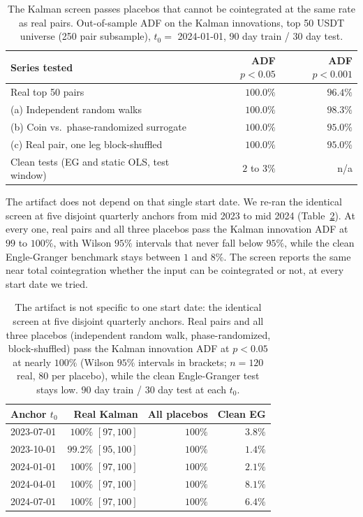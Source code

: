 \documentclass[11pt]{article}
\begin{document}
\begin{table}[h]
\centering
\caption{The Kalman screen passes placebos that cannot be cointegrated at the same rate as
real pairs. Out-of-sample ADF on the Kalman innovations, top 50 USDT universe (250 pair
subsample), $t_0 =$
2024-01-01, 90 day train / 30 day test.}
\label{tab:kalman-placebo}
\begin{tabular}{lrr}
\toprule
Series tested & ADF $p<0.05$ & ADF $p<0.001$ \\
\midrule
Real top 50 pairs & $100.0\%$ & $96.4\%$ \\
(a) Independent random walks & $100.0\%$ & $98.3\%$ \\
(b) Coin vs.\ phase-randomized surrogate & $100.0\%$ & $95.0\%$ \\
(c) Real pair, one leg block-shuffled & $100.0\%$ & $95.0\%$ \\
\midrule
Clean tests (EG and static OLS, test window) & $2$ to $3\%$ & n/a \\
\bottomrule
\end{tabular}
\end{table}

The artifact does not depend on that single start date. We re-ran the identical screen at five
disjoint quarterly anchors from mid 2023 to mid 2024 (Table~\ref{tab:kalman-anchors}). At every
one, real pairs and all three placebos pass the Kalman innovation ADF at $99$ to $100\%$, with
Wilson $95\%$ intervals that never fall below $95\%$, while the clean Engle-Granger benchmark
stays between $1$ and $8\%$. The screen reports the same near total cointegration whether the
input can be cointegrated or not, at every start date we tried.

\begin{table}[h]
\centering
\caption{The artifact is not specific to one start date: the identical screen at five disjoint
quarterly anchors. Real pairs and all three placebos (independent random walk, phase-randomized,
block-shuffled) pass the Kalman innovation ADF at $p<0.05$ at nearly $100\%$ (Wilson $95\%$
intervals in brackets; $n=120$ real, $80$ per placebo), while the clean Engle-Granger test stays
low. $90$ day train / $30$ day test at each $t_0$.}
\label{tab:kalman-anchors}
\begin{tabular}{lrrr}
\toprule
Anchor $t_0$ & Real Kalman & All placebos & Clean EG \\
\midrule
2023-07-01 & $100\%$ $[97,100]$ & $100\%$ & $3.8\%$ \\
2023-10-01 & $99.2\%$ $[95,100]$ & $100\%$ & $1.4\%$ \\
2024-01-01 & $100\%$ $[97,100]$ & $100\%$ & $2.1\%$ \\
2024-04-01 & $100\%$ $[97,100]$ & $100\%$ & $8.1\%$ \\
2024-07-01 & $100\%$ $[97,100]$ & $100\%$ & $6.4\%$ \\
\bottomrule
\end{tabular}
\end{table}
\end{document}
